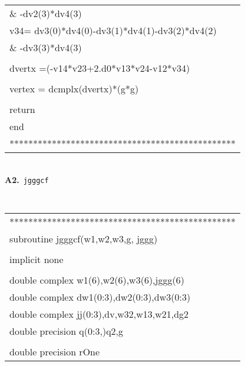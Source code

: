 \begin{center}
{\begin{supertabular}{l}
       \hspace{0.5em}\& \hspace{1.5em}-dv2(3)*dv4(3)\\
      \hspace{0.5em} v34= dv3(0)*dv4(0)-dv3(1)*dv4(1)-dv3(2)*dv4(2)\\
       \hspace{0.5em}\& \hspace{1.5em}-dv3(3)*dv4(3)\\
\\
      \hspace{0.5em} dvertx =(-v14*v23+2.d0*v13*v24-v12*v34)\\
\\
      \hspace{0.5em} vertex = dcmplx(dvertx)*(g*g)\\
\\
      \hspace{0.5em} return\\
      \hspace{0.5em} end\\
************************************************\\
\end{supertabular}
}\\
\vspace{1em}
{\bf A2.}~{\tt jgggcf}\\
{\tt
\begin{supertabular}{l}
************************************************\\
       \hspace{0.5em} subroutine jgggcf(w1,w2,w3,g, jggg)\\
\\
       \hspace{0.5em} implicit none\\
\\
      \hspace{0.5em} double complex w1(6),w2(6),w3(6),jggg(6)\\
      \hspace{0.5em} double complex dw1(0:3),dw2(0:3),dw3(0:3)\\
      \hspace{0.5em} double complex jj(0:3),dv,w32,w13,w21,dg2\\
      \hspace{0.5em} double precision q(0:3,)q2,g\\
\\
      \hspace{0.5em} double precision rOne\\

\end{supertabular}}
\end{center}
